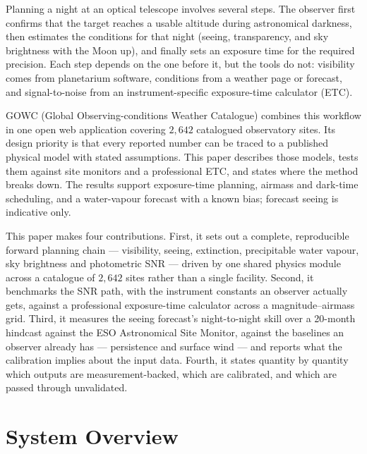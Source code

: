 \documentclass[11pt]{article}
\begin{document}
Planning a night at an optical telescope involves several steps. The observer
first confirms that the target reaches a usable altitude during astronomical
darkness, then estimates the conditions for that night (seeing, transparency, and
sky brightness with the Moon up), and finally sets an exposure time for the
required precision. Each step depends on the one before it, but the tools do not:
visibility comes from planetarium software, conditions from a weather page or
forecast, and signal-to-noise from an instrument-specific exposure-time
calculator (ETC).

GOWC (Global Observing-conditions Weather Catalogue) combines this workflow in one open web
application covering $2{,}642$ catalogued observatory sites. Its design
priority is that every reported number can be traced to a published physical
model with stated assumptions. This paper describes those models, tests them against
site monitors and a professional ETC, and states where the method breaks down. The
results support exposure-time planning, airmass and dark-time scheduling, and a
water-vapour forecast with a known bias; forecast seeing is indicative only.

This paper makes four contributions. First, it sets out a complete, reproducible
forward planning chain --- visibility, seeing, extinction, precipitable water vapour,
sky brightness and photometric SNR --- driven by one shared physics module across a
catalogue of $2{,}642$ sites rather than a single facility. Second, it benchmarks the
SNR path, with the instrument constants an observer actually gets, against a
professional exposure-time calculator across a magnitude--airmass grid. Third, it
measures the seeing forecast's night-to-night skill over a 20-month hindcast against
the ESO Astronomical Site Monitor, against the baselines an observer already has ---
persistence and surface wind --- and reports what the calibration implies about the
input data. Fourth, it states quantity by quantity which outputs are
measurement-backed, which are calibrated, and which are passed through unvalidated.

\section{System Overview}
\end{document}
